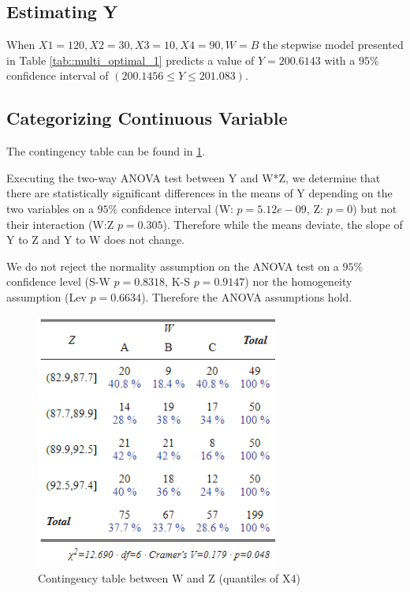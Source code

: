 \documentclass[12pt, a4paper]{article}
\begin{document}
	
	\subsection{Estimating Y}
	
	When $X1=120, X2=30, X3=10, X4=90, W=B$ the stepwise model presented in Table \ref{tab::multi_optimal_1} predicts a value of $Y=200.6143$ with a $95\%$ confidence interval of $(200.1456 \leq Y \leq 201.083)$.
	
	
	\subsection{Categorizing Continuous Variable}
	The contingency table can be found in \ref{fig::contigency_1}.
	
	Executing the two-way ANOVA test between Y and W*Z, we determine that there are statistically significant differences in the means of Y depending on the two variables on a $95\%$ confidence interval (W: $p=5.12e-09$, Z: $p=0$) but not their interaction (W:Z $p= 0.305$). Therefore while the means deviate, the slope of Y to Z and Y to W does not change.
	
	We do not reject the normality assumption on the ANOVA test on a $95\%$ confidence level (S-W $p=0.8318$, K-S $p=0.9147$) nor the homogeneity assumption (Lev $p=0.6634$). Therefore the ANOVA assumptions hold.
	
	\begin{figure}
		\includegraphics[width=8cm]{contigency_1.png}
		\centering
		\caption{Contingency table between W and Z (quantiles of X4)}
		\label{fig::contigency_1}
	\end{figure}
	
\end{document}
